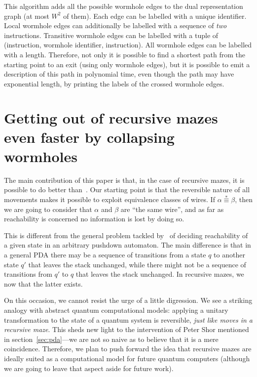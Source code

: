 \documentclass[a4paper,UKenglish,cleveref, autoref]{lipics-v2021}
\begin{document}
This algorithm adds all the possible wormhole edges to the dual representation
graph (at most $W^2$ of them). Each edge can be labelled with a unique
identifier. Local wormhole edges can additionally be labelled with a sequence of
\emph{two} instructions. Transitive wormhole edges can be labelled with a tuple
of (instruction, wormhole identifier, instruction). All wormhole edges can be
labelled with a length. Therefore, not only it is possible to find a shortest
path from the starting point to an exit (using only wormhole edges), but it is
possible to emit a description of this path in polynomial time, even though the
path may have exponential length, by printing the labels of the crossed wormhole
edges.

\section{Getting out of recursive mazes even faster by collapsing wormholes}
\label{sec:us}


The main contribution of this paper is that, in the case of recursive mazes, it
is possible to do better
than~\cite{DBLP:conf/concur/BouajjaniEM97,DBLP:journals/entcs/FinkelWW97}. Our
starting point is that the reversible nature of all movements makes it possible
to exploit equivalence classes of wires. If $\alpha \stackrel{*}{\equiv} \beta$,
then we are going to consider that $\alpha$ and $\beta$ are ``the same wire'',
and as far as reachability is concerned no information is lost by doing so.

This is different from the general problem tackled
by~\cite{DBLP:conf/concur/BouajjaniEM97,DBLP:journals/entcs/FinkelWW97} of
deciding reachability of a given state in an arbitrary pushdown automaton. The
main difference is that in a general PDA there may be a sequence of transitions
from a state $q$ to another state $q'$ that leaves the stack unchanged, while
there might not be a sequence of transitions from $q'$ to $q$ that leaves the
stack unchanged. In recursive mazes, we now that the latter exists.

On this occasion, we cannot resist the urge of a little digression.  We see a
striking analogy with abstract quantum computational models: applying a unitary
transformation to the state of a quantum system is reversible, \emph{just like
  moves in a recursive maze}. This sheds new light to the intervention of Peter
Shor mentioned in section~\ref{sec:pda}---we are not so naive as to believe that
it is a mere coincidence. Therefore, we plan to push forward the idea that
recursive mazes are ideally suited as a computational model for future quantum
computers (although we are going to leave that aspect aside for future work).
\end{document}
